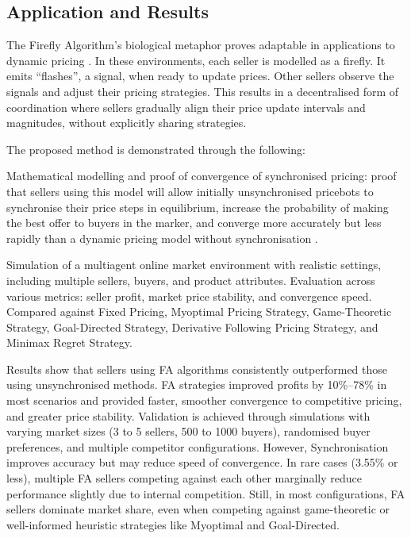 \documentclass[a4paper, 12pt]{extarticle}
\begin{document}
\subsection{Application and Results} 

The Firefly Algorithm’s biological metaphor proves adaptable in applications to dynamic pricing \cite{jumadinova2008firefly}. In these environments, each seller is modelled as a firefly. It emits “flashes”, a signal, when ready to update prices. Other sellers observe the signals and adjust their pricing strategies. This results in a decentralised form of coordination where sellers gradually align their price update intervals and magnitudes, without explicitly sharing strategies. 

The proposed method is demonstrated through the following: 

Mathematical modelling and proof of convergence of synchronised pricing: proof that sellers using this model will allow initially unsynchronised pricebots to synchronise their price steps in equilibrium, increase the probability of making the best offer to buyers in the marker, and converge more accurately but less rapidly than a dynamic pricing model without synchronisation \cite{jumadinova2008firefly}. 

Simulation of a multiagent online market environment with realistic settings, including multiple sellers, buyers, and product attributes. 
Evaluation across various metrics: seller profit, market price stability, and convergence speed. Compared against Fixed Pricing, Myoptimal Pricing Strategy, Game-Theoretic Strategy, Goal-Directed Strategy, Derivative Following Pricing Strategy, and Minimax Regret Strategy. 

Results show that sellers using FA algorithms consistently outperformed those using unsynchronised methods. FA strategies improved profits by 10\%–78\% in most scenarios and provided faster, smoother convergence to competitive pricing, and greater price stability. Validation is achieved through simulations with varying market sizes (3 to 5 sellers, 500 to 1000 buyers), randomised buyer preferences, and multiple competitor configurations. However, Synchronisation improves accuracy but may reduce speed of convergence. In rare cases (3.55\% or less), multiple FA sellers competing against each other marginally reduce performance slightly due to internal competition. Still, in most configurations, FA sellers dominate market share, even when competing against game-theoretic or well-informed heuristic strategies like Myoptimal and Goal-Directed. 
\end{document}
